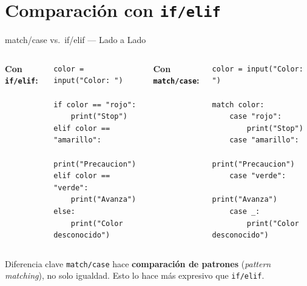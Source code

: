 \documentclass[aspectratio=169,xcolor=dvipsnames]{beamer}
\begin{document}
\section{Comparación con \texttt{if/elif}}

\begin{frame}[fragile]{match/case vs.\ if/elif — Lado a Lado}
    \begin{columns}
        \textbf{Con \texttt{if/elif}:}
        \begin{lstlisting}[style=PythonStyle]
color = input("Color: ")

if color == "rojo":
    print("Stop")
elif color == "amarillo":
    print("Precaucion")
elif color == "verde":
    print("Avanza")
else:
    print("Color desconocido")
        \end{lstlisting}

        \textbf{Con \texttt{match/case}:}
        \begin{lstlisting}[style=PythonStyle]
color = input("Color: ")

match color:
    case "rojo":
        print("Stop")
    case "amarillo":
        print("Precaucion")
    case "verde":
        print("Avanza")
    case _:
        print("Color desconocido")
        \end{lstlisting}
    \end{columns}

    \vspace{0.2cm}
    \begin{alertblock}{Diferencia clave}
        \texttt{match/case} hace \textbf{comparación de patrones} (\textit{pattern matching}), no solo igualdad. Esto lo hace más expresivo que \texttt{if/elif}.
    \end{alertblock}
\end{frame}
\end{document}
